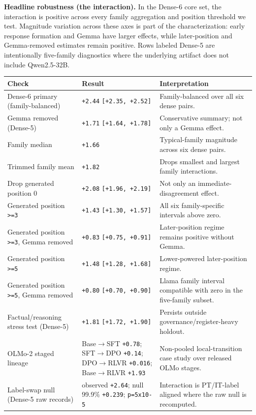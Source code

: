 \documentclass[11pt]{article}
\begin{document}
\textbf{Headline robustness (the interaction).} In the Dense-6 core set, the interaction is positive across every family aggregation and position threshold we test. Magnitude variation across these axes is part of the characterization: early response formation and Gemma have larger effects, while later-position and Gemma-removed estimates remain positive. Rows labeled Dense-5 are intentionally five-family diagnostics where the underlying artifact does not include Qwen2.5-32B.

\begin{table}[t]
\centering
\small
\setlength{\tabcolsep}{3pt}
\begin{tabularx}{\linewidth}{@{}>{\raggedright\arraybackslash}X >{\raggedright\arraybackslash}X >{\raggedright\arraybackslash}X@{}}
\toprule
Check & Result & Interpretation \\
\midrule
Dense-6 primary (family-balanced) & \texttt{+2.44} \texttt{[+2.35, +2.52]} & Family-balanced over all six dense pairs. \\
Gemma removed (Dense-5) & \texttt{+1.71} \texttt{[+1.64, +1.78]} & Conservative summary; not only a Gemma effect. \\
Family median & \texttt{+1.66} & Typical-family magnitude across six dense pairs. \\
Trimmed family mean & \texttt{+1.82} & Drops smallest and largest family interactions. \\
Drop generated position 0 & \texttt{+2.08} \texttt{[+1.96, +2.19]} & Not only an immediate-disagreement effect. \\
Generated position \texttt{>=3} & \texttt{+1.43} \texttt{[+1.30, +1.57]} & All six family-specific intervals above zero. \\
Generated position \texttt{>=3}, Gemma removed & \texttt{+0.83} \texttt{[+0.75, +0.91]} & Later-position regime remains positive without Gemma. \\
Generated position \texttt{>=5} & \texttt{+1.48} \texttt{[+1.28, +1.68]} & Lower-powered later-position regime. \\
Generated position \texttt{>=5}, Gemma removed & \texttt{+0.80} \texttt{[+0.70, +0.90]} & Llama family interval compatible with zero in the five-family subset. \\
Factual/reasoning stress test (Dense-5) & \texttt{+1.81} \texttt{[+1.72, +1.90]} & Persists outside governance/register-heavy holdout. \\
OLMo-2 staged lineage & Base\ensuremath{\to}SFT \texttt{+0.78}; SFT\ensuremath{\to}DPO \texttt{+0.14}; DPO\ensuremath{\to}RLVR \texttt{+0.016}; Base\ensuremath{\to}RLVR \texttt{+1.93} & Non-pooled local-transition case study over released OLMo stages. \\
Label-swap null (Dense-5 raw records) & observed \texttt{+2.64}; null 99.9\% \texttt{+0.239}; \texttt{p=5x10-5} & Interaction is PT/IT-label aligned where the raw null is recomputed. \\
\bottomrule
\end{tabularx}
\end{table}
\end{document}
